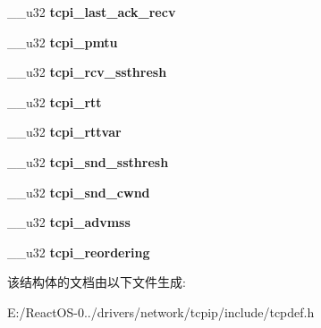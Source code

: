 \begin{DoxyCompactItemize}
\+\_\+\+\_\+u32 {\bfseries tcpi\+\_\+last\+\_\+ack\+\_\+recv}
\item 
\mbox{\label{structtcp__info_ab3ee0551a986fc58d4643d595f4e3531}} 
\+\_\+\+\_\+u32 {\bfseries tcpi\+\_\+pmtu}
\item 
\mbox{\label{structtcp__info_a5fb35c4fc6b86e79e7b3f97657623ff4}} 
\+\_\+\+\_\+u32 {\bfseries tcpi\+\_\+rcv\+\_\+ssthresh}
\item 
\mbox{\label{structtcp__info_aa3b61d765836c4a13e3a1bd69b108250}} 
\+\_\+\+\_\+u32 {\bfseries tcpi\+\_\+rtt}
\item 
\mbox{\label{structtcp__info_ad92f3958ca1d998e4f54ff2cee7a60c2}} 
\+\_\+\+\_\+u32 {\bfseries tcpi\+\_\+rttvar}
\item 
\mbox{\label{structtcp__info_ac89ea452a497b746bc006f9878e26202}} 
\+\_\+\+\_\+u32 {\bfseries tcpi\+\_\+snd\+\_\+ssthresh}
\item 
\mbox{\label{structtcp__info_a0240d3ccd94c6333100fafbfde488990}} 
\+\_\+\+\_\+u32 {\bfseries tcpi\+\_\+snd\+\_\+cwnd}
\item 
\mbox{\label{structtcp__info_a7cdefd5f0a54839a2fdb31e4f60e8e82}} 
\+\_\+\+\_\+u32 {\bfseries tcpi\+\_\+advmss}
\item 
\mbox{\label{structtcp__info_a3aef2a39b00bb9fa24f030e6fe09097f}} 
\+\_\+\+\_\+u32 {\bfseries tcpi\+\_\+reordering}
\end{DoxyCompactItemize}


该结构体的文档由以下文件生成\+:\begin{DoxyCompactItemize}
\item 
E\+:/\+React\+O\+S-\/0../drivers/network/tcpip/include/tcpdef.\+h\end{DoxyCompactItemize}
